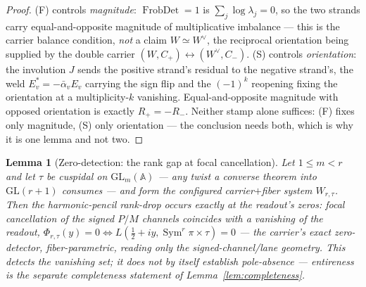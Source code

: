 \documentclass[11pt]{article}
\newtheorem{lemma}[theorem]{Lemma}
\theoremstyle{definition}
\newcommand{\Sym}{\operatorname{Sym}}
\begin{document}
\begin{proof}
\textup{(F)} controls \emph{magnitude}: $\operatorname{FrobDet}=1$ is $\sum_j\log\lambda_j=0$, so the two
strands carry equal-and-opposite magnitude of multiplicative imbalance --- this is the carrier balance
condition, \emph{not} a claim $W\simeq W^\vee$, the reciprocal orientation being supplied by the double
carrier $(W,C_+)\leftrightarrow(W^\vee,C_-)$. \textup{(S)} controls \emph{orientation}: the involution $J$
sends the positive strand's residual to the negative strand's, the weld $E_v^{*}=-\bar\alpha_v E_v$ carrying
the sign flip and the $(-1)^k$ reopening fixing the orientation at a multiplicity-$k$ vanishing. Equal-and-opposite magnitude with opposed orientation is exactly $R_+=-R_-$. Neither stamp alone suffices: (F) fixes
only magnitude, (S) only orientation --- the conclusion needs both, which is why it is one lemma and not two.
\end{proof}

\begin{lemma}[Zero-detection: the rank gap at focal cancellation]\label{lem:rankgap}
Let $1\le m<r$ and let $\tau$ be cuspidal on $\mathrm{GL}_m(\mathbb A)$ --- any twist a converse theorem
into $\mathrm{GL}(r+1)$ consumes --- and form the configured carrier$+$fiber system $W_{r,\tau}$. Then the
harmonic-pencil rank-drop occurs \emph{exactly at the readout's zeros}: focal cancellation of the signed
$P/M$ channels coincides with a vanishing of the readout,
$\Phi_{r,\tau}(y)=0\iff L(\tfrac12+iy,\Sym^r\pi\times\tau)=0$ --- the carrier's exact zero-detector,
fiber-parametric, reading only the signed-channel/lane geometry. \emph{This detects the vanishing set; it
does not by itself establish pole-absence --- entireness is the separate completeness statement of
Lemma~\ref{lem:completeness}.}
\end{lemma}
\end{document}
